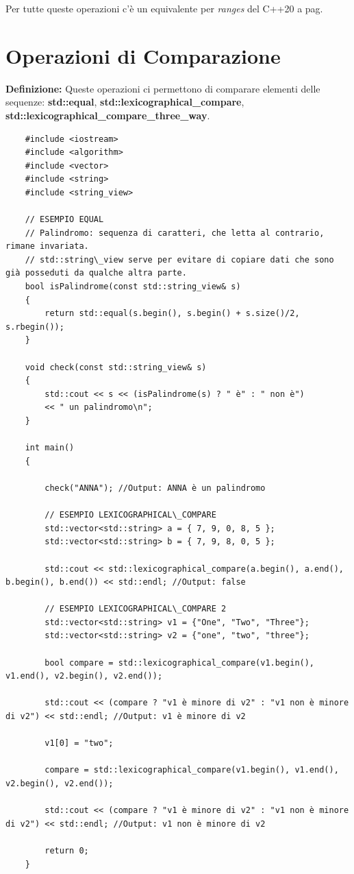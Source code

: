 \fleuron

\textsf{\small Per tutte queste operazioni c'è un equivalente per \emph{ranges} del C++20 a pag. \pageref{ranges_minmax}} \\


\newpage

\section{Operazioni di Comparazione}

\textsf{\small \textbf{Definizione: } Queste operazioni ci permettono di comparare elementi delle sequenze: \textbf{std::equal}, \textbf{std::lexicographical\_compare}, \textbf{std::lexicographical\_compare\_three\_way}.} \\

\begin{lstlisting}
	#include <iostream>
	#include <algorithm>
	#include <vector>
	#include <string>
	#include <string_view>
	
	// ESEMPIO EQUAL
	// Palindromo: sequenza di caratteri, che letta al contrario, rimane invariata.
	// std::string\_view serve per evitare di copiare dati che sono già posseduti da qualche altra parte.
	bool isPalindrome(const std::string_view& s)
	{
		return std::equal(s.begin(), s.begin() + s.size()/2, s.rbegin());
	}
	
	void check(const std::string_view& s)
	{
		std::cout << s << (isPalindrome(s) ? " è" : " non è")
		<< " un palindromo\n";
	}
	
	int main()
	{
	
		check("ANNA"); //Output: ANNA è un palindromo
		
		// ESEMPIO LEXICOGRAPHICAL\_COMPARE
		std::vector<std::string> a = { 7, 9, 0, 8, 5 };
		std::vector<std::string> b = { 7, 9, 8, 0, 5 };
		
		std::cout << std::lexicographical_compare(a.begin(), a.end(), b.begin(), b.end()) << std::endl; //Output: false
		
		// ESEMPIO LEXICOGRAPHICAL\_COMPARE 2
		std::vector<std::string> v1 = {"One", "Two", "Three"};
		std::vector<std::string> v2 = {"one", "two", "three"};
		
		bool compare = std::lexicographical_compare(v1.begin(), v1.end(), v2.begin(), v2.end());
		
		std::cout << (compare ? "v1 è minore di v2" : "v1 non è minore di v2") << std::endl; //Output: v1 è minore di v2
		
		v1[0] = "two";
		
		compare = std::lexicographical_compare(v1.begin(), v1.end(), v2.begin(), v2.end());
		
		std::cout << (compare ? "v1 è minore di v2" : "v1 non è minore di v2") << std::endl; //Output: v1 non è minore di v2
		
		return 0;
	}
\end{lstlisting}


